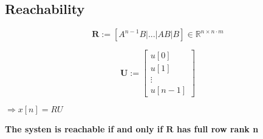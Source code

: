 \subsection{Reachability}
    \begin{minipage}{0.63\linewidth}
        $$
            \mathbf{R} := \left[A^{n-1}B | ... | AB | B \right] \in \mathbb{R}^{n\times n \cdot m}
        $$
    \end{minipage}
    \begin{minipage}{0.36\linewidth}
        $$
            \mathbf{U} :=
            \begin{bmatrix}
                u[0] \\
                u[1] \\
                \vdots \\
                u[n -1]
            \end{bmatrix}
        $$
    \end{minipage}

    $\Rightarrow x[n] = RU$
    \vspace{5pt}

    \textbf{The systen is reachable if and only if $\mathbf{R}$ has full row rank n}